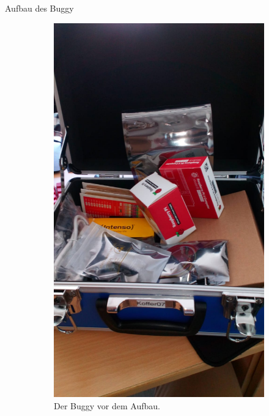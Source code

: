 \documentclass[12pt]{report}
\begin{document}
\begin{section}{Aufbau des Buggy}

\begin{figure}[h!]
  \centering
  \captionsetup[subfigure]{labelformat=empty}
  \begin{subfigure}{0.45\linewidth}
    \includegraphics[width=\linewidth]{lernportfolio_assets/Buggy_Koffer.jpeg}
    \caption{Der Buggy vor dem Aufbau.}
  \end{subfigure}
  \begin{subfigure}{0.45\linewidth}

\end{subfigure}
\end{figure}
\end{section}
\end{document}
